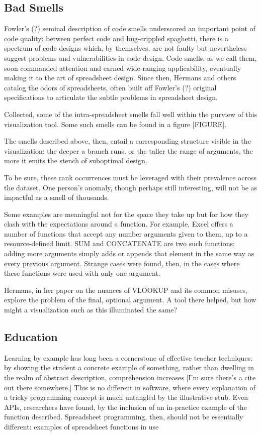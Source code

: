 \documentclass[conference]{IEEEtran}
\begin{document}
	\subsection{Bad Smells} Fowler's (?) seminal description of code smells
	underscored an important point of code quality: between perfect code and
	bug-crippled spaghetti,  there is a spectrum of code designs which, by
	themselves, are not faulty but nevertheless suggest problems and
	vulnerabilities in code design. Code smells, as we call them, soon commanded
	attention and earned wide-ranging applicability, eventually making it to the
	art of spreadsheet design. Since then, Hermans and others catalog the odors of
	spreadsheets, often built off Fowler's (?) original specifications to
	articulate the subtle problems in spreadsheet design. \par Collected, some of
	the intra-spreadsheet smells fall well within the purview of this visualization
	tool. Some such smells can be found in a figure [FIGURE]. \par The smells
	described above, then, entail a corresponding structure visible in the
	visualization: the deeper a branch runs, or the taller the range of arguments,
	the more it emits the stench of suboptimal design. \par To be sure, these rank
	occurrences must be leveraged with their prevalence across the dataset. One
	person's anomaly, though perhaps still interesting, will not be as impactful as
	a smell of thousands. \par Some examples are meaningful not for the space they
	take up but for how they clash with the expectations around a function. For
	example, Excel offers a number of functions that accept any number arguments
	given to them, up to a resource-defined limit. SUM and CONCATENATE are two such
	functions: adding more arguments simply adds or appends that element in the
	same way as every previous argument. Strange cases were found, then, in the
	cases where these functions were used with only one argument. \par Hermans, in
	her paper on the nuances of VLOOKUP and its common misuses, explore the problem
	of the final, optional argument. A tool there helped, but how might a
	visualization such as this illuminated the same?
	
	\subsection{Education} Learning by example has long been a cornerstone of
	effective teacher techniques: by showing the student a concrete example of
	something, rather than dwelling in the realm of abstract description,
	comprehension increases [I'm sure there's a cite out there somewhere.] This is
	no different in software, where every explanation of a tricky programming
	concept is much untangled by the illustrative stub. Even APIs, researchers have
	found, by the inclusion of an in-practice example of the function described.
	Spreadsheet programming, then, should not be essentially different: examples of
	spreadsheet functions in use
	
\end{document}
